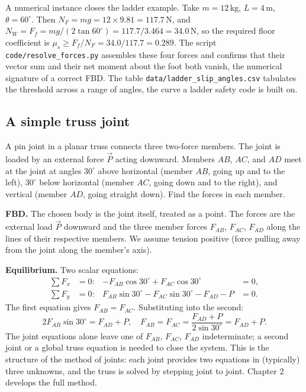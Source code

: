 A numerical instance closes the ladder example. Take $m = 12\,\si{
\kilogram}$, $L = 4\,\si{\meter}$, $\theta = 60^{\circ}$. Then $N_F =
mg = 12 \times 9.81 = 117.7\,\text{N}$, and $N_W = F_f = mg / (2\tan
60^{\circ}) = 117.7 / 3.464 = 34.0\,\text{N}$, so the required floor
coefficient is $\mu_s \ge F_f / N_F = 34.0/117.7 = 0.289$. The script
\texttt{code/resolve\_forces.py} assembles these four forces and
confirms that their vector sum and their net moment about the foot both
vanish, the numerical signature of a correct FBD. The table
\texttt{data/ladder\_slip\_angles.csv} tabulates the threshold across a
range of angles, the curve a ladder safety code is built on.

\subsection{A simple truss joint}



A pin joint in a planar truss connects three two-force members. The
joint is loaded by an external force $\vec{P}$ acting downward.
Members $AB$, $AC$, and $AD$ meet at the joint at angles $30^{\circ}$
above horizontal (member $AB$, going up and to the left),
$30^{\circ}$ below horizontal (member $AC$, going down and to the
right), and vertical (member $AD$, going straight down). Find the
forces in each member.

\textbf{FBD.} The chosen body is the joint itself, treated as a point.
The forces are the external load $\vec{P}$ downward and the three
member forces $F_{AB}$, $F_{AC}$, $F_{AD}$ along the lines of their
respective members. We assume tension positive (force pulling away
from the joint along the member's axis).

\textbf{Equilibrium.} Two scalar equations:
\begin{align*}
\sum F_x &= 0: & -F_{AB} \cos 30^{\circ} + F_{AC} \cos 30^{\circ} &=
0, \\
\sum F_y &= 0: & F_{AB} \sin 30^{\circ} - F_{AC} \sin 30^{\circ} -
F_{AD} - P &= 0.
\end{align*}
The first equation gives $F_{AB} = F_{AC}$. Substituting into the
second:
\[
2 F_{AB} \sin 30^{\circ} = F_{AD} + P, \quad F_{AB} = F_{AC} =
\frac{F_{AD} + P}{2 \sin 30^{\circ}} = F_{AD} + P.
\]
The joint equations alone leave one of $F_{AB}$, $F_{AC}$, $F_{AD}$
indeterminate; a second joint or a global truss equation is needed
to close the system. This is the structure of the method of joints:
each joint provides two equations in (typically) three unknowns, and
the truss is solved by stepping joint to joint. Chapter 2 develops
the full method.

